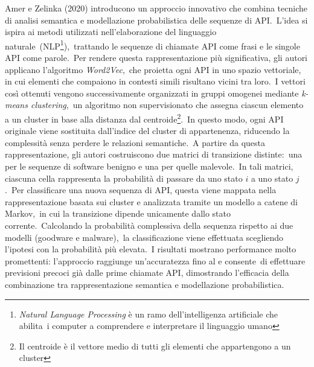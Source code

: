 Amer e Zelinka (2020) introducono un approccio innovativo che combina tecniche di analisi semantica e modellazione probabilistica delle sequenze di API.\
L'idea si ispira ai metodi utilizzati nell'elaborazione del linguaggio naturale\
(NLP\footnote{\textit{Natural Language Processing} è un ramo dell'intelligenza artificiale che abilita\
      i computer a comprendere e interpretare il linguaggio umano }),\
trattando le sequenze di chiamate API come frasi e le singole API come parole.\
Per rendere questa rappresentazione più significativa, gli autori applicano l'algoritmo \textit{Word2Vec},\
che proietta ogni API in uno spazio vettoriale, in cui elementi che compaiono in contesti simili risultano vicini tra loro.\
I vettori così ottenuti vengono successivamente organizzati in gruppi omogenei mediante \textit{k-means clustering},\
un algoritmo non supervisionato che assegna ciascun elemento a un cluster in base alla distanza dal centroide\footnote{Il centroide è il vettore medio di tutti gli elementi che appartengono a un cluster}.\
In questo modo, ogni API originale viene sostituita dall'indice del cluster di appartenenza, riducendo la complessità senza perdere le relazioni semantiche.\
A partire da questa rappresentazione, gli autori costruiscono due matrici di transizione distinte:\
una per le sequenze di software benigno e una per quelle malevole.\
In tali matrici, ciascuna cella rappresenta la probabilità di passare da uno stato $i$ a uno stato $j$.\
Per classificare una nuova sequenza di API, questa viene mappata nella rappresentazione basata sui cluster e analizzata tramite un modello a catene di Markov,\
in cui la transizione dipende unicamente dallo stato corrente.\
Calcolando la probabilità complessiva della sequenza rispetto ai due modelli (goodware e malware),\
la classificazione viene effettuata scegliendo l'ipotesi con la probabilità più elevata.\
I risultati mostrano performance molto promettenti: l'approccio raggiunge un'accuratezza fino al  e consente\
di effettuare previsioni precoci già dalle prime chiamate API, dimostrando l'efficacia della combinazione tra rappresentazione semantica e modellazione probabilistica.


